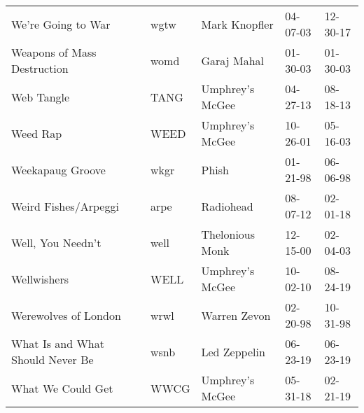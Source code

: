 \begin{longtable}{p{}p{}p{}p{}p{}}
                                                      We're Going to War &          wgtw &                                            Mark Knopfler &              04-07-03 &             12-30-17 \\
                                             Weapons of Mass Destruction &          womd &                                              Garaj Mahal &              01-30-03 &             01-30-03 \\
                                                              Web Tangle &          TANG &                                          Umphrey's McGee &              04-27-13 &             08-18-13 \\
                                                                Weed Rap &          WEED &                                          Umphrey's McGee &              10-26-01 &             05-16-03 \\
                                                        Weekapaug Groove &          wkgr &                                                    Phish &              01-21-98 &             06-06-98 \\
                                                    Weird Fishes/Arpeggi &          arpe &                                                Radiohead &              08-07-12 &             02-01-18 \\
                                                       Well, You Needn't &          well &                                          Thelonious Monk &              12-15-00 &             02-04-03 \\
                                                             Wellwishers &          WELL &                                          Umphrey's McGee &              10-02-10 &             08-24-19 \\
                                                    Werewolves of London &          wrwl &                                             Warren Zevon &              02-20-98 &             10-31-98 \\
                                        What Is and What Should Never Be &          wsnb &                                             Led Zeppelin &              06-23-19 &             06-23-19 \\
                                                       What We Could Get &          WWCG &                                          Umphrey's McGee &              05-31-18 &             02-21-19 \\

\end{longtable}
